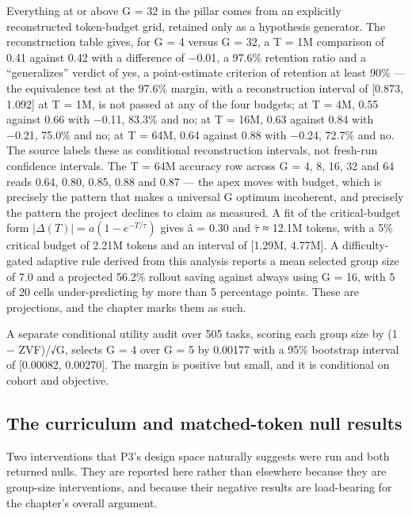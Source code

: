 \documentclass[12pt,a4paper]{report}
\begin{document}
Everything at or above G = 32 in the pillar comes from an explicitly
reconstructed token-budget grid, retained only as a hypothesis
generator. The reconstruction table gives, for G = 4 versus G = 32, a T
= 1M comparison of 0.41 against 0.42 with a difference of −0.01, a
97.6\% retention ratio and a ``generalizes'' verdict of yes, a
point-estimate criterion of retention at least 90\% --- the equivalence
test at the 97.6\% margin, with a reconstruction interval of {[}0.873,
1.092{]} at T = 1M, is not passed at any of the four budgets; at T = 4M,
0.55 against 0.66 with −0.11, 83.3\% and no; at T = 16M, 0.63 against
0.84 with −0.21, 75.0\% and no; at T = 64M, 0.64 against 0.88 with
−0.24, 72.7\% and no. The source labels these as conditional
reconstruction intervals, not fresh-run confidence intervals. The T =
64M accuracy row across G = 4, 8, 16, 32 and 64 reads 0.64, 0.80, 0.85,
0.88 and 0.87 --- the apex moves with budget, which is precisely the
pattern that makes a universal G optimum incoherent, and precisely the
pattern the project declines to claim as measured. A fit of the
critical-budget form \(|\Delta(T)| = a(1 - e^{-T/\tau})\) gives â = 0.30
and \ensuremath{\hat{τ}} ≈ 12.1M tokens, with a 5\% critical budget of 2.21M tokens and an
interval of {[}1.29M, 4.77M{]}. A difficulty-gated adaptive rule derived
from this analysis reports a mean selected group size of 7.0 and a
projected 56.2\% rollout saving against always using G = 16, with 5 of
20 cells under-predicting by more than 5 percentage points. These are
projections, and the chapter marks them as such.

A separate conditional utility audit over 505 tasks, scoring each group
size by (1 − ZVF)/√G, selects G = 4 over G = 5 by 0.00177 with a 95\%
bootstrap interval of {[}0.00082, 0.00270{]}. The margin is positive but
small, and it is conditional on cohort and objective.

\subsection{The curriculum and matched-token null
results}\label{the-curriculum-and-matched-token-null-results}

Two interventions that P3's design space naturally suggests were run and
both returned nulls. They are reported here rather than elsewhere
because they are group-size interventions, and because their negative
results are load-bearing for the chapter's overall argument.
\end{document}
